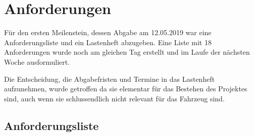 \chapter{Anforderungen}
Für den ersten Meilenstein, dessen Abgabe am 12.05.2019 war eine Anforderungsliste und ein Lastenheft abzugeben. Eine Liste mit 18 Anforderungen wurde noch am gleichen Tag erstellt und im Laufe der nächsten Woche ausformuliert.

Die Entscheidung, die Abgabefristen und Termine in das Lastenheft aufzunehmen, wurde getroffen da sie elementar für das Bestehen des Projektes sind, auch wenn sie schlussendlich nicht relevant für das Fahrzeug sind. 

\section{Anforderungsliste}
